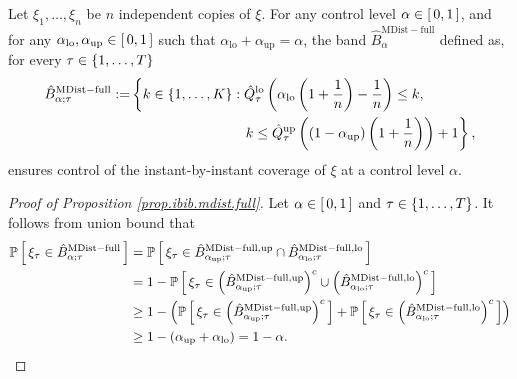 \documentclass[11pt]{article}
\begin{document}
\begin{proposition}
\label{prop.ibib.mdist.full}
Let $\xi_1, \ldots, \xi_n$ be $n$ independent copies of $\xi$.
%
%
%
For any control level $\alpha \in \left[\, 0, 1 \,\right]$,
and for any $\alpha_{\mathrm{lo}}, \alpha_{\mathrm{up}} \in \left[\, 0, 1 \,\right]$ such that $\alpha_{\mathrm{lo}} + \alpha_{\mathrm{up}} = \alpha$,
the band $\hat{B}^{\mathrm{MDist-full}}_{\alpha}$ defined as,
for every $\tau \in \left\{ 1, \ldots, T \right\}$
\begin{align}
    \label{eq.ibib.mdist.full}
    \hat{B}_{\alpha; \tau}^{\mathrm{MDist-full}}
    :=
    &
    \left\{
    k \in \left\{ 1, \ldots, K \right\} :
    \hat{Q}_{\tau}^{\mathrm{lo}} \left( \alpha_{\mathrm{lo}} \left( 1 + \frac{1}{n} \right) - \frac{1}{n} \right)
    \leq k,
    \right.
    \notag
    \\
    &
    \qquad
    \qquad
    \qquad
    \qquad
    \left.
    k \leq \hat{Q}_{\tau}^{\mathrm{up}} \left( \left( 1 - \alpha_{\mathrm{up}} \right) \left( 1 + \frac{1}{n} \right) \right) + 1
    \right\},
\end{align}
ensures control of the instant-by-instant coverage of $\xi$ at a control level $\alpha$.
\end{proposition}
\begin{proof}[Proof of Proposition \ref{prop.ibib.mdist.full}]
Let $\alpha \in \left[\, 0, 1 \,\right]$ and $\tau \in \left\{ 1, \ldots, T \right\}$. It follows from union bound that
\begin{align*}
    \mathbb{P}
    \left[\, 
        \xi_{\tau}
        \in
        \hat{B}_{\alpha; \tau}^{\mathrm{MDist-full}}
     \,\right]
    &
    =
    \mathbb{P}
    \left[\, 
        \xi_{\tau}
        \in
        \hat{B}_{\alpha_{\mathrm{up}}; \tau}^{\mathrm{MDist-full, up}}
        \cap
        \hat{B}_{\alpha_{\mathrm{lo}}; \tau}^{\mathrm{MDist-full, lo}}
     \,\right]
    \\
    &
    =
    1
    -
    \mathbb{P}
    \left[\, 
        \xi_{\tau}
        \in
        \left( \hat{B}_{\alpha_{\mathrm{up}}; \tau}^{\mathrm{MDist-full, up}} \right)^{c}
        \cup
        \left( \hat{B}_{\alpha_{\mathrm{lo}}; \tau}^{\mathrm{MDist-full, lo}} \right)^{c}
     \,\right]
    \\
    &
    \geq
    1
    -
    \left( 
        \mathbb{P}
    \left[\, 
        \xi_{\tau}
        \in
        \left( \hat{B}_{\alpha_{\mathrm{up}}; \tau}^{\mathrm{MDist-full, up}} \right)^{c}
     \,\right]
    +
    \mathbb{P}
    \left[\, 
        \xi_{\tau}
        \in
        \left( \hat{B}_{\alpha_{\mathrm{lo}}; \tau}^{\mathrm{MDist-full, lo}} \right)^{c}
     \,\right]
     \right)
    \\
    &
    \geq
    1
    -
    \left(  \alpha_{\mathrm{up}} + \alpha_{\mathrm{lo}}
     \right) = 1 - \alpha.
\end{align*}
\end{proof}
\end{document}
